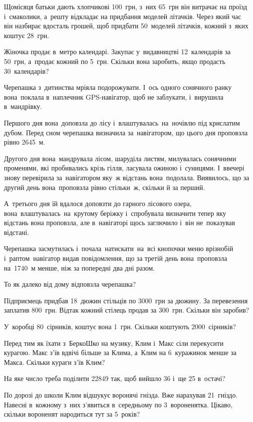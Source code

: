 \problem
Щомісяця батьки дають хлопчикові 100~грн, з~них 65~грн він витрачає
на проїзд і~смаколики, а~решту відкладає на придбання моделей літачків.
Через який час він назбирає вдосталь грошей, щоб придбати 50~моделей літачків,
кожний з~яких коштує 28~грн.


\problem
Жіночка продає в~метро календарі.
Закупає у~видавництві 12~календарів за 50~грн, а~продає кожний по 5~грн.
Скільки вона заробить, якщо продасть 30~календарів?


\problem
Черепашка з~дитинства мріяла подорожувати. І~ось одного сонячного ранку
вона поклала в~наплечник GPS-навігатор, щоб не заблукати,
і~вирушила в~мандрівку.

Першого дня вона доповзла до лісу і~влаштувалась на ночівлю під крислатим
дубом. Перед сном черепашка визначила за навігатором, що цього дня
проповзла рівно 2645~м.

Другого дня вона мандрувала лісом, шаруділа листям, милувалась сонячними
променями, які пробивались крізь гілля, ласувала ожиною і~суницями.
І~ввечері знову перевірила за навігатором яку~ж відстань вона подолала.
Виявилось, що за другий день вона проповзла рівно стільки~ж,
скільки й за перший.

А~третього дня їй вдалося доповзти до гарного лісового озера,
вона влаштувалась на крутому беріжку і~спробувала визначити тепер
яку відстань вона проповзла, але в~навігаторі щось заглючило
і~він не~показував відстані.

Черепашка засмутилась і~почала натискати на всі кнопочки меню врізнобій
і~раптом навігатор видав повідомлення, що за третій день вона проповзла
на 1740~м менше, ніж за попередні два дні разом.

То як далеко від дому відповзла черепашка?


\problem
Підприємець придбав 18~дюжин стільців по 3000~грн за дюжину.
За перевезення заплатив 800~грн.
Відтак кожний стілець продав за 300~грн.
Скільки він заробив?


\problem
У~коробці 80~сірників, коштує вона 1~грн.
Скільки коштують 2000~сірників?


\problem
Перед тим як їхати з~БеркоШко на музику, Клим і~Макс сіли перекусити курагою.
Макс з’їв вдвічі більше за Клима, а~Клим на 6~куражинок менше за Макса.
Скільки кураги з’їв Клим?


\problem
На яке число треба поділити 22849 так, щоб вийшло 36 і~ще 25 в~остачі?


\problem
По дорозі до школи Клим відшукує воронячі гнізда. Вже нарахував 21~гніздо.
Навесні в~кожному з~них з’явиться в~середньому по 3~вороненятка.
Цікаво, скільки вороненят народиться тут за 5~років?


